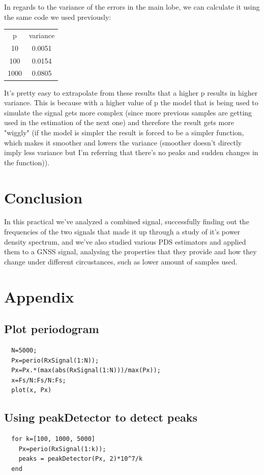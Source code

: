 \documentclass[conference,9pt]{IEEEtran}
\begin{document}
In regards to the variance of the errors in the main lobe, we can calculate it using the same code we used previously:

\begin{center}
  \begin{tabular}{ c c }
   p & variance \\
   10 &  0.0051 \\
   100 &  0.0154 \\
   1000 & 0.0805    
  \end{tabular}
\end{center}

It's pretty easy to extrapolate from these results that a higher p results in higher variance. This is because with a higher value of p the model that is being used to simulate the signal gets more complex (since more previous samples are getting used in the estimation of the next one) and therefore the result gets more "wiggly" (if the model is simpler the result is forced to be a simpler function, which makes it smoother and lowers the variance (smoother doesn't directly imply less variance but I'm referring that there's no peaks and sudden changes in the function)).

\section{Conclusion}
In this practical we've analyzed a combined signal, successfully finding out the frequencies of the two signals that made it up through a study of it's power density spectrum, and we've also studied various PDS estimators and applied them to a GNSS signal, analysing the properties that they provide and how they change under different circustances, such as lower amount of samples used.

\section{Appendix}
\subsection{Plot periodogram}
\begin{verbatim}
  N=5000;
  Px=perio(RxSignal(1:N));
  Px=Px.*(max(abs(RxSignal(1:N)))/max(Px));
  x=Fs/N:Fs/N:Fs;
  plot(x, Px)
\end{verbatim}

\subsection{Using peakDetector to detect peaks}
\begin{verbatim}
  for k=[100, 1000, 5000]
    Px=perio(RxSignal(1:k));
    peaks = peakDetector(Px, 2)*10^7/k
  end
\end{verbatim}
\end{document}
